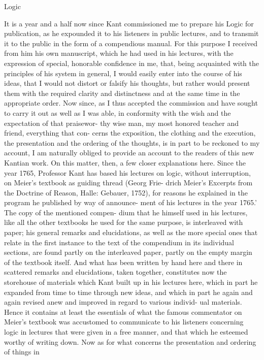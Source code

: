 Logic

It is a year and a half now since Kant commissioned me to prepare his
Logic for publication, as he expounded it to his listeners in public lectures,
and to transmit it to the public in the form of a compendious manual. For
this purpose I received from him his own manuscript, which he had used
in his lectures, with the expression of special, honorable confidence in me,
that, being acquainted with the principles of his system in general, I would
easily enter into the course of his ideas, that I would not distort or falsify
his thoughts, but rather would present them with the required clarity and
distinctness and at the same time in the appropriate order. Now since, as I
thus accepted the commission and have sought to carry it out as well as I
was able, in conformity with the wish and the expectation of that praisewor-
thy wise man, my most honored teacher and friend, everything that con-
cerns the exposition, the clothing and the execution, the presentation and
the ordering of the thoughts, is in part to be reckoned to my account, I am
naturally obliged to provide an account to the readers of this new Kantian
work. On this matter, then, a few closer explanations here.
Since the year 1765, Professor Kant has based his lectures on logic,
without interruption, on Meier's textbook as guiding thread (Georg Frie-
drich Meier's Excerpts from the Doctrine of Reason, Halle: Gebauer, 1752),
for reasons he explained in the program he published by way of announce-
ment of his lectures in the year 1765.' The copy of the mentioned compen-
dium that he himself used in his lectures, like all the other textbooks he
used for the same purpose, is interleaved with paper; his general remarks
and elucidations, as well as the more special ones that relate in the first
instance to the text of the compendium in its individual sections, are
found partly on the interleaved paper, partly on the empty margin of the
textbook itself. And what has been written by hand here and there in
scattered remarks and elucidations, taken together, constitutes now the
storehouse of materials which Kant built up in his lectures here, which in
part he expanded from time to time through new ideas, and which in part
he again and again revised anew and improved in regard to various individ-
ual materials. Hence it contains at least the essentials of what the famous
commentator on Meier's textbook was accustomed to communicate to his
listeners concerning logic in lectures that were given in a free manner, and
that which he esteemed worthy of writing down.
Now as for what concerns the presentation and ordering of things in
